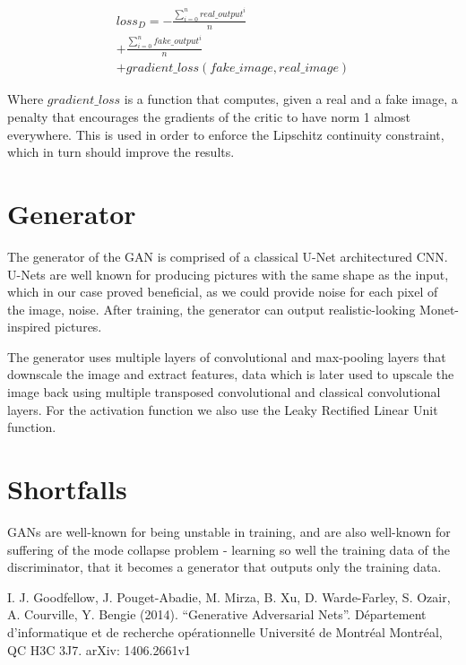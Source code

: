 \documentclass[conference]{IEEEtran}
\begin{document}
\begin{multline}
    loss_{D} = - \frac{\sum_{i=0}^{n} real\_output^i}{n} \\
               + \frac{\sum_{i=0}^{n} fake\_output^i}{n} \\
               + gradient\_loss(fake\_image, real\_image)
\end{multline}

    Where $gradient\_loss$ is a function that computes, given a real and a fake image, a penalty that encourages the gradients
of the critic to have norm 1 almost everywhere. This is used in order to enforce the Lipschitz continuity constraint, which
in turn should improve the results.

\section{Generator}
    The generator of the GAN is comprised of a classical U-Net architectured CNN. U-Nets are well known for producing pictures
with the same shape as the input, which in our case proved beneficial, as we could provide noise for each pixel of the image,
noise. After training, the generator can output realistic-looking Monet-inspired pictures.

    The generator uses multiple layers of convolutional and max-pooling layers that downscale the image and extract features,
data which is later used to upscale the image back using multiple transposed convolutional and classical convolutional layers.
For the activation function we also use the Leaky Rectified Linear Unit function.

\section{Shortfalls}
    GANs are well-known for being unstable in training, and are also well-known for suffering of the mode collapse problem -
learning so well the training data of the discriminator, that it becomes a generator that outputs only the training data.

\begin{thebibliography}{00}
     I. J. Goodfellow, J. Pouget-Abadie, M. Mirza, B. Xu, D. Warde-Farley, S. Ozair, A. Courville, Y. Bengie
    (2014). ``Generative Adversarial Nets''. Département d'informatique et de recherche opérationnelle Université de Montréal
    Montréal, QC H3C 3J7. arXiv: 1406.2661v1
\end{thebibliography}
\end{document}
